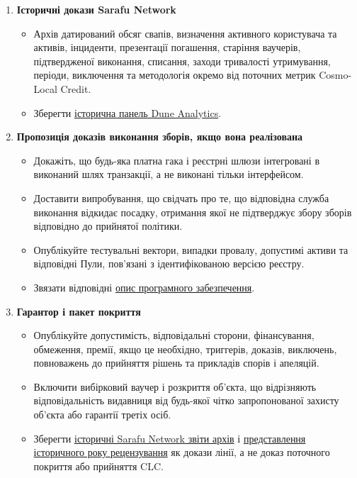 \documentclass[11pt]{article}
\begin{document}
\begin{enumerate}[leftmargin=*]
\item \textbf{Історичні докази Sarafu Network}
\begin{itemize}[leftmargin=*]
\item Архів датирований обсяг свапів, визначення активного користувача та активів, інциденти, презентації погашення, старіння ваучерів, підтвердженої виконання, списання, заходи тривалості утримування, періоди, виключення та методологія окремо від поточних метрик Cosmo-Local Credit.
\item Зберегти \href{https://dune.com/grassrootseconomics/sarafu-network}{історична панель Dune Analytics}.
\end{itemize}
\item \textbf{Пропозиція доказів виконання зборів, якщо вона реалізована}
\begin{itemize}[leftmargin=*]
\item Докажіть, що будь-яка платна гака і реєстрні шлюзи інтегровані в виконаний шлях транзакції, а не виконані тільки інтерфейсом.
\item Доставити випробування, що свідчать про те, що відповідна служба виконання відкидає посадку, отримання якої не підтверджує збору зборів відповідно до прийнятої політики.
\item Опублікуйте тестувальні вектори, випадки провалу, допустимі активи та відповідні Пули, пов'язані з ідентифікованою версією реєстру.
\item Звязати відповідні \href{https://software.grassecon.org}{опис програмного забезпечення}.
\end{itemize}
\item \textbf{Гарантор і пакет покриття}
\begin{itemize}[leftmargin=*]
\item Опублікуйте допустимість, відповідальні сторони, фінансування, обмеження, премії, якщо це необхідно, триггерів, доказів, виключень, повноважень до прийняття рішень та прикладів спорів і апеляцій.
\item Включити вибірковий ваучер і розкриття об'єкта, що відрізняють відповідальність видавниця від будь-якої чітко запропонованої захисту об'єкта або гарантії третіх осіб.
\item Зберегти \href{https://sarafu.network/reports}{історичні Sarafu Network звіти архів} і \href{https://youtu.be/5yGaP31bvs0?si=fZ-AMTEXsmVR8Ulv}{представлення історичного року рецензування} як докази лінії, а не доказ поточного покриття або прийняття CLC.

\end{itemize}
\end{enumerate}
\end{document}
